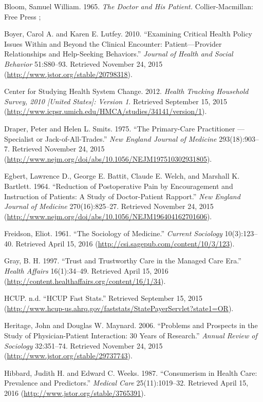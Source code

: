 \documentclass[12pt,twoside]{reedthesis}
\begin{document}
  Bloom, Samuel William. 1965. \emph{The Doctor and His Patient.}
  Collier-Macmillan: Free Press ;
  
  Boyer, Carol A. and Karen E. Lutfey. 2010. ``Examining Critical Health
  Policy Issues Within and Beyond the Clinical Encounter:
  Patient---Provider Relationships and Help-Seeking Behaviors.''
  \emph{Journal of Health and Social Behavior} 51:S80--93. Retrieved
  November 24, 2015 (\url{http://www.jstor.org/stable/20798318}).
  
  Center for Studying Health System Change. 2012. \emph{Health Tracking
  Household Survey, 2010 {[}United States{]}: Version 1}. Retrieved
  September 15, 2015
  (\url{http://www.icpsr.umich.edu/HMCA/studies/34141/version/1}).
  
  Draper, Peter and Helen L. Smits. 1975. ``The Primary-Care Practitioner
  --- Specialist or Jack-of-All-Trades.'' \emph{New England Journal of
  Medicine} 293(18):903--7. Retrieved November 24, 2015
  (\url{http://www.nejm.org/doi/abs/10.1056/NEJM197510302931805}).
  
  Egbert, Lawrence D., George E. Battit, Claude E. Welch, and Marshall K.
  Bartlett. 1964. ``Reduction of Postoperative Pain by Encouragement and
  Instruction of Patients: A Study of Doctor-Patient Rapport.'' \emph{New
  England Journal of Medicine} 270(16):825--27. Retrieved November 24,
  2015 (\url{http://www.nejm.org/doi/abs/10.1056/NEJM196404162701606}).
  
  Freidson, Eliot. 1961. ``The Sociology of Medicine.'' \emph{Current
  Sociology} 10(3):123--40. Retrieved April 15, 2016
  (\url{http://csi.sagepub.com/content/10/3/123}).
  
  Gray, B. H. 1997. ``Trust and Trustworthy Care in the Managed Care
  Era.'' \emph{Health Affairs} 16(1):34--49. Retrieved April 15, 2016
  (\url{http://content.healthaffairs.org/content/16/1/34}).
  
  HCUP. n.d. ``HCUP Fast Stats.'' Retrieved September 15, 2015
  (\url{http://www.hcup-us.ahrq.gov/faststats/StatePayerServlet?state1=OR}).
  
  Heritage, John and Douglas W. Maynard. 2006. ``Problems and Prospects in
  the Study of Physician-Patient Interaction: 30 Years of Research.''
  \emph{Annual Review of Sociology} 32:351--74. Retrieved November 24,
  2015 (\url{http://www.jstor.org/stable/29737743}).
  
  Hibbard, Judith H. and Edward C. Weeks. 1987. ``Consumerism in Health
  Care: Prevalence and Predictors.'' \emph{Medical Care} 25(11):1019--32.
  Retrieved April 15, 2016 (\url{http://www.jstor.org/stable/3765391}).
  
\end{document}
